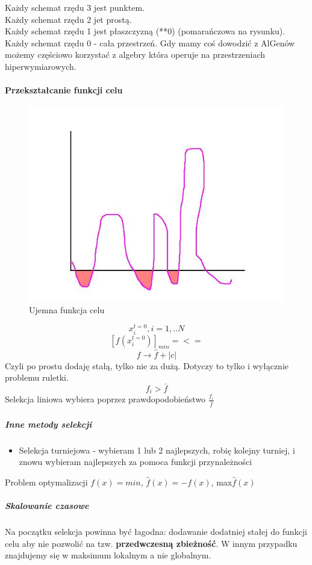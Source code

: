 \documentclass{article}
\begin{document}
			Każdy schemat rzędu 3 jest punktem.\\
			Każdy schemat rzędu 2 jet prostą. \\
			Każdy schemat rzędu 1 jest płaszczyzną (**0) (pomarańczowa na rysunku).
			\\ Każdy schemat rzędu 0 - cała przestrzeń. Gdy mamy coś dowodzić z AlGenów możemy częściowo korzystać z algebry która operuje na przestrzeniach hiperwymiarowych.
			\paragraph{Przekształcanie funkcji celu}
			
				\begin{figure}[ht]
					\label{fig:fig2}
					\centering
					\includegraphics[scale=0.5]{ujemna_funkcja_celu.jpeg}
					\caption{Ujemna funkcja celu}
				\end{figure}
				
				$$x_i^{t=0}, i=1,..N$$
				$$[f(x_i^{t=0})]_{min}=<=$$
				$$f\rightarrow\hat{f} + |c|$$
				Czyli po prostu dodaję stałą, tylko nie za dużą. Dotyczy to tylko i wyłącznie problemu ruletki. 
				$$f_i > \bar{f}$$
				Selekcja liniowa wybiera poprzez prawdopodobieństwo $\frac{f_i}{\bar{f}}$
			\subparagraph{Inne metody selekcji}
				\begin{itemize}
					\item Selekcja turniejowa - wybieram 1 lub 2 najlepszych, robię kolejny turniej, i znowu wybieram najlepszych za pomoca funkcji przynależności	
				\end{itemize}
			Problem optymalizacji $f(x)=min$, $\hat{f}(x)=-f(x)$, max$\hat{f}(x)$
			\subparagraph{Skalowanie czasowe}
			Na początku selekcja powinna być łagodna: dodawanie dodatniej stałej do funkcji celu aby nie pozwolić na tzw. \textbf{przedwczesną zbieżność}. W innym przypadku znajdujemy się w maksimum lokalnym a nie globalnym.
				
\end{document}
